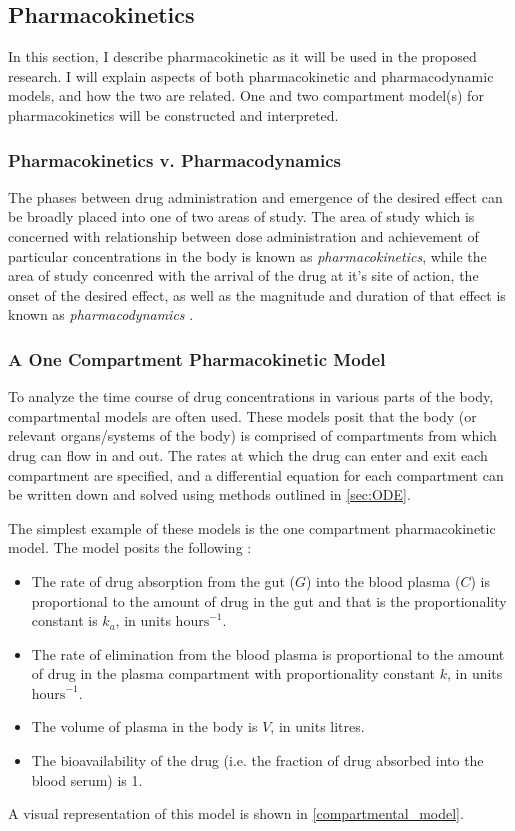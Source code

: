 \subsection{Pharmacokinetics}

In this section, I describe pharmacokinetic as it will be used in the proposed research.  I will explain aspects of both pharmacokinetic and pharmacodynamic models, and how the two are related.  One and two compartment model(s) for pharmacokinetics will be constructed and interpreted.


\subsubsection{Pharmacokinetics v. Pharmacodynamics}

The phases between drug administration and emergence of the desired effect can be broadly placed into one of two areas of study.  The area of study which is concerned with relationship between dose administration and achievement of particular concentrations in the body is known as \textit{pharmacokinetics}, while the area of study concenred with the arrival of the drug at it's site of action, the onset of the desired effect, as well as the magnitude and duration of that effect is known as  \textit{pharmacodynamics} \cite{rosenbaum2016basic}.  

\subsubsection{A One Compartment Pharmacokinetic Model}

To analyze the time course of drug concentrations in various parts of the body, compartmental models are often used.  These models posit that the body (or relevant organs/systems of the body) is comprised of compartments from which drug can flow in and out. The rates at which the drug can enter and exit each compartment are specified, and a differential equation for each compartment can be written down and solved using methods outlined in \cref{sec:ODE}.

The simplest example of these models is the one compartment pharmacokinetic model.  The model posits the following \cite{wakefield1992bayesian}:  
%
\begin{itemize}
\item The rate of drug absorption from the gut ($ G  $) into the blood plasma ($ C $) is proportional to the amount of drug in the gut and that is the proportionality constant is $ k_a $, in units $ \text{hours}^{-1} $.  

\item The rate of elimination from the blood plasma is proportional to the amount of drug in the plasma compartment with proportionality constant $ k $, in units $ \text{hours}^{-1} $.

\item The volume of plasma in the body is $ V $, in units litres.

\item The bioavailability of the drug (i.e. the fraction of drug absorbed into the blood serum) is 1.
\end{itemize}
%
 A visual representation of this model is shown in \cref{compartmental_model}.

